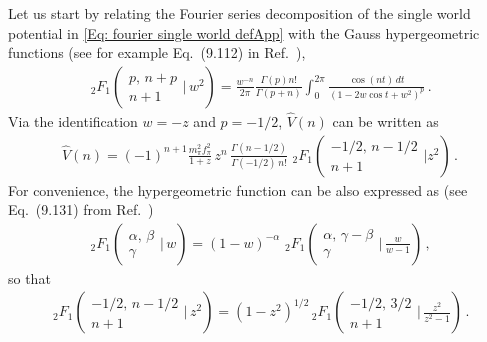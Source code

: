 \documentclass[a4paper,12pt]{article}
\numberwithin{equation}{section}
\renewcommand{\[}{\left[}
\renewcommand{\]}{\right]}
\renewcommand{\(}{\left(}
\renewcommand{\)}{\right)}
\begin{document}
\begin{small}
Let us start by relating the Fourier series decomposition of the single world potential in \cref{Eq: fourier single world defApp} with the Gauss hypergeometric functions (see for example Eq.~(9.112) in Ref.~\cite{GRADSHTEYN1980904}),
\begin{align}
\,_2F_{1}\left(\begin{array}{c}
p ,\,n+p\\
 n+1
\end{array} \bigg|\,w^2\right)=
\frac{w^{-n}}{2 \pi} \frac{\Gamma(p) n !}{\Gamma(p+n)} \int_{0}^{2 \pi} \frac{\cos (n t)\, d t}{\left(1-2 w \cos t+w^{2}\right)^{p}}  \,.
\end{align}
Via the identification $w=-z$ and $p=-1/2$, $\hat V(n)$ can be written as
\begin{align}
\hat V(n)=(-1)^{n+1}  \frac{m_{\pi}^{2} f_{\pi}^{2}}{1+z}\, z^{n} \,\frac{\Gamma(n-1/2)}{\Gamma(-1/2) \,n !}\, 
\,_2F_{1}\left(\begin{array}{c}
-1/2,\, n-1/2\\
 n+1
\end{array} \bigg|z^2\right) \, . 
\label{Eq: fourier hypergeome}
\end{align}
For convenience, the hypergeometric function can be also expressed as (see Eq.~(9.131) from Ref.~\cite{GRADSHTEYN1980904})
\begin{align}
\,_2F_{1}\left(\begin{array}{c}
\alpha,\, \beta\\
\gamma
\end{array} \bigg|\,w\right)
=(1-w)^{-\alpha}\,\,_2F_{1}\left(\begin{array}{c}
\alpha,\, \gamma-\beta\\
\gamma
\end{array} \bigg|\,\frac{w}{w-1}\right) \, , 
\end{align}
so that
\begin{align}
\,_2F_{1}\left(\begin{array}{c}
-1/2,\, n-1/2\\
n+1
\end{array} \bigg|\,z^2\right)
=\left(1-z^2\right)^{1/2} 
\,_2F_{1}\left(\begin{array}{c}
-1/2,\, 3/2\\
n+1
\end{array} \bigg|\,\frac{z^2}{z^2-1}\right) \, .
\end{align}






\end{small}
\end{document}
